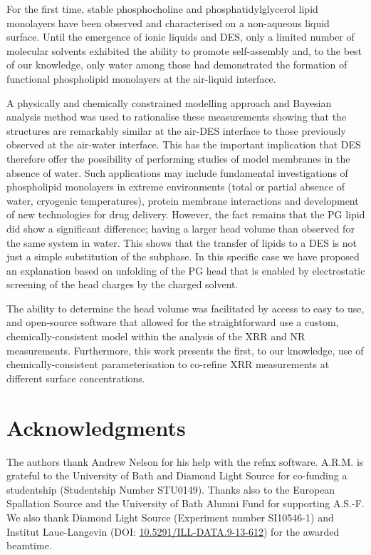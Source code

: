 \documentclass[twocolumn,a4paper]{paper}
\begin{document}
For the first time, stable phosphocholine and phosphatidylglycerol lipid monolayers have been observed and characterised on a non-aqueous liquid surface.
Until the emergence of ionic liquids and DES, only a limited number of molecular solvents exhibited the ability to promote self-assembly and, to the best of our knowledge, only water among those had demonstrated the formation of functional phospholipid monolayers at the air-liquid interface.

A physically and chemically constrained modelling approach and Bayesian analysis method was used to rationalise these measurements showing that the structures are remarkably similar at the air-DES interface to those previously observed at the air-water interface.
This has the important implication that DES therefore offer the possibility of performing studies of model membranes in the absence of water.
Such applications may include fundamental investigations of phospholipid monolayers in extreme environments (total or partial absence of water, cryogenic temperatures), protein membrane interactions and development of new technologies for drug delivery.
However, the fact remains that the PG lipid did show a significant difference; having a larger head volume than observed for the same system in water.
This shows that the transfer of lipids to a DES is not just a simple substitution of the subphase. In this specific case we have proposed an explanation based on unfolding of the PG head that is enabled by electrostatic screening of the head charges by the charged solvent.

The ability to determine the head volume was facilitated by access to easy to use, and open-source software that allowed for the straightforward use a custom, chemically-consistent model within the analysis of the XRR and NR measurements.
Furthermore, this work presents the first, to our knowledge, use of chemically-consistent parameterisation to co-refine XRR measurements at different surface concentrations.

\section*{Acknowledgments}

The authors thank Andrew Nelson for his help with the refnx software.
A.R.M. is grateful to the University of Bath and Diamond Light Source for co-funding a studentship (Studentship Number STU0149).
Thanks also to the European Spallation Source and the University of Bath Alumni Fund for supporting A.S.-F.
We also thank Diamond Light Source (Experiment number SI10546-1) and Institut Laue-Langevin (DOI: \href{http://doi.org/10.5291/ILL-DATA.9-13-612}{10.5291/ILL-DATA.9-13-612}) for the awarded beamtime.

\setlength{\bibsep}{1pt}

\end{document}
